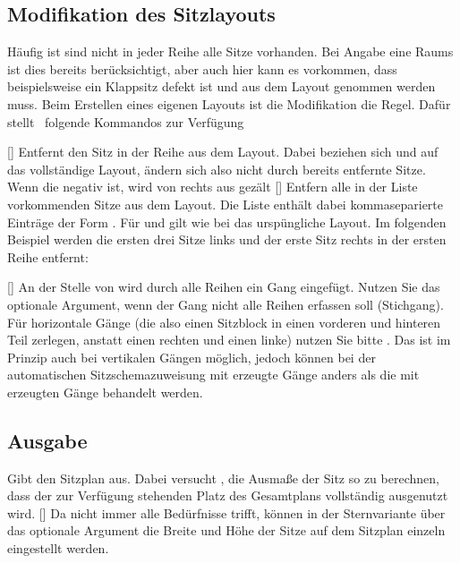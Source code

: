 \documentclass{cnltx-doc}
\def\packagename{tucseating}
\def\thepkg{\pkg*{\packagename}}
\begin{document}
\subsection{Modifikation des Sitzlayouts}
\label{sec:modify-layout}
Häufig ist sind nicht in jeder Reihe alle Sitze vorhanden.
Bei Angabe eine Raums ist dies bereits berücksichtigt, aber auch hier kann es
vorkommen, dass beispielsweise ein Klappsitz defekt ist und aus dem Layout
genommen werden muss.
Beim Erstellen eines eigenen Layouts ist die Modifikation die Regel.
Dafür stellt \pkg\ folgende Kommandos zur Verfügung
\begin{commands}
  []
  Entfernt den Sitz  in der Reihe  aus dem
  Layout. Dabei beziehen sich  und  auf das
  vollständige Layout, ändern sich also nicht durch bereits entfernte Sitze.
  Wenn die  negativ ist, wird von rechts aus gezält
  []
  Entfern alle in der Liste vorkommenden Sitze aus dem Layout. Die Liste enthält
  dabei kommaseparierte Einträge der Form
  . Für  und
   gilt wie bei  das urspüngliche Layout.
  Im folgenden Beispiel werden die ersten drei Sitze links und der erste Sitz
  rechts in der ersten Reihe entfernt:
  \begin{example}
  \end{example}
  []
  An der Stelle von  wird durch alle Reihen ein Gang eingefügt. Nutzen Sie das
  optionale Argument, wenn der Gang nicht alle Reihen erfassen soll (Stichgang).
  Für horizontale Gänge (die also einen Sitzblock in einen vorderen und hinteren
  Teil zerlegen, anstatt einen rechten und einen linke) nutzen Sie bitte
  .
  Das ist im Prinzip auch bei vertikalen Gängen möglich, jedoch können bei der automatischen
  Sitzschemazuweisung mit  erzeugte Gänge anders als die mit
   erzeugten Gänge behandelt werden.
\end{commands}

\subsection{Ausgabe}
\label{sec:drawing}
\begin{commands}
  
  Gibt den Sitzplan aus. Dabei versucht \thepkg, die Ausmaße der Sitz so zu
  berechnen, dass der zur Verfügung stehenden Platz des Gesamtplans vollständig
  ausgenutzt wird.
  [\sarg{}]
  Da  nicht immer alle Bedürfnisse trifft, können in der
  Sternvariante über das optionale Argument die Breite und Höhe der Sitze auf
  dem Sitzplan einzeln eingestellt werden.
\end{commands}
\end{document}
